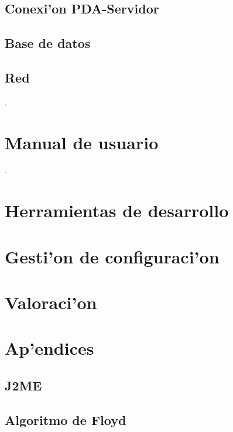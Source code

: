 \documentclass[a4paper]{article}
\begin{document}
\begin{large}
	\subsection{Conexi'on PDA-Servidor}
		

	\subsection{Base de datos}
		

	\subsection{Red}
		


\newpage
.
\newpage

\section{Manual de usuario}
		

\newpage
.
\newpage

\section{Herramientas de desarrollo}
	

\newpage 

\section{Gesti'on de configuraci'on}
	


\newpage

\section{Valoraci'on}
	

\newpage

\section{Ap'endices}

	\subsection{J2ME}
		

	\subsection{Algoritmo de Floyd}
		


\end{large}
\end{document}
